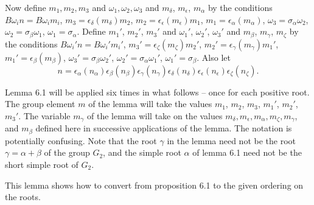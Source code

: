 \documentclass{memo-l}
\theoremstyle{definition}
\theoremstyle{remark}
\numberwithin{section}{chapter}
\numberwithin{equation}{chapter}
\begin{document}
Now define $m_{1}, m_{2}, m_{3}$ and ${\omega}_{1}, {\omega}_{2},
{\omega}_{3}$ and $m_{{\delta}}$, $m_{{\epsilon}}$, $m_{{\alpha}}$ by the
conditions $B{\omega}_{i}n = B{\omega}_{i}m_{i}$,
$m_{3} =
{\epsilon}_{{\delta}}(m_{{\delta}})m_{2}$, $m_{2} =
{\epsilon}_{{\epsilon}}(m_{{\epsilon}})m_{1}$,
$m_{1} =
{\epsilon}_{{\alpha}}(m_{{\alpha}})$,
${\omega}_{3} =
{\sigma}_{{\alpha}}{\omega}_{2}$,
${\omega}_{2} =
{\sigma}_{{\beta}}{\omega}_{1}$,
${\omega}_{1} = {\sigma}_{{\alpha}}$.
 Define $m_{1}'$, $m_{2}'$, $m_{3}'$ and ${\omega}_{1}'$, ${\omega}_{2}'$,
${\omega}_{3}'$ and $m_{{\beta}}$, $m_{{\gamma}}$, $m_{{\zeta}}$ by the
conditions $B{\omega}_{i}'n=B{\omega}_{i}'m_{i}'$,
$m_{3}' =
{\epsilon}_{{\zeta}}(m_{{\zeta}})m_{2}'$, $m_{2}' =
{\epsilon}_{{\gamma}}(m_{{\gamma}})m_{1}'$,
$m_{1}' =
{\epsilon}_{{\beta}}(m_{{\beta}})$,
${\omega}_{3}' =
{\sigma}_{{\beta}}{\omega}_{2}'$, ${\omega}_{2}' =
{\sigma}_{{\alpha}}{\omega}_{1}'$, ${\omega}_{1}' = {\sigma}_{{\beta}}$.
 Also let $$n = {\epsilon}_{{\alpha}}(n_{{\alpha}}){\epsilon}_{{\beta}}
(n_{{\beta}}){\epsilon}_{{\gamma}}(n_{{\gamma}}){\epsilon}_{{\delta}}
(n_{{\delta}}){\epsilon}_{{\epsilon}}(n_{{\epsilon}}){\epsilon}_{{\zeta}}
(n_{{\zeta}}).$$


   Lemma 6.1 will be applied six times in what follows -- once for
each positive root.
 The group element $m$ of the lemma will take the values $m_{1}$, $m_{2}$, $m_{3}$,
$m_{1}'$, $m_{2}'$, $m_{3}'$.
 The variable $m_{{\gamma}}$ of the lemma will take on the values
$m_{{\delta}}, m_{{\epsilon}}, m_{{\alpha}}, m_{{\zeta}}, m_{{\gamma}}$,
and $m_{{\beta}}$ defined here in successive applications of the lemma.
 The notation is potentially confusing.
 Note that the root ${\gamma}$ in the lemma need not be the root ${\gamma}
= {\alpha}+{\beta}$ of the group $G_{2}$, and the simple root ${\alpha}$ of
lemma 6.1 need not be the short simple root of $G_{2}$.


This lemma shows how to convert from proposition 6.1 to the given ordering
on the roots.
\end{document}
